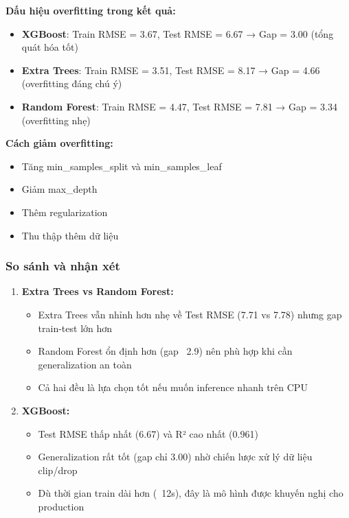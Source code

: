\documentclass[12pt,a4paper]{article}
\begin{document}
\textbf{Dấu hiệu overfitting trong kết quả:}
\begin{itemize}
    \item \textbf{XGBoost}: Train RMSE = 3.67, Test RMSE = 6.67 → Gap = 3.00 (tổng quát hóa tốt)
    \item \textbf{Extra Trees}: Train RMSE = 3.51, Test RMSE = 8.17 → Gap = 4.66 (overfitting đáng chú ý)
    \item \textbf{Random Forest}: Train RMSE = 4.47, Test RMSE = 7.81 → Gap = 3.34 (overfitting nhẹ)
\end{itemize}

\textbf{Cách giảm overfitting:}
\begin{itemize}
    \item Tăng min\_samples\_split và min\_samples\_leaf
    \item Giảm max\_depth
    \item Thêm regularization
    \item Thu thập thêm dữ liệu
\end{itemize}

\subsubsection{So sánh và nhận xét}

\begin{enumerate}
    \item \textbf{Extra Trees vs Random Forest:} 
    \begin{itemize}
        \item Extra Trees vẫn nhỉnh hơn nhẹ về Test RMSE (7.71 vs 7.78) nhưng gap train-test lớn hơn
        \item Random Forest ổn định hơn (gap ~2.9) nên phù hợp khi cần generalization an toàn
        \item Cả hai đều là lựa chọn tốt nếu muốn inference nhanh trên CPU
    \end{itemize}
    
    \item \textbf{XGBoost:}
    \begin{itemize}
        \item Test RMSE thấp nhất (6.67) và R² cao nhất (0.961)
        \item Generalization rất tốt (gap chỉ 3.00) nhờ chiến lược xử lý dữ liệu clip/drop
        \item Dù thời gian train dài hơn (~12s), đây là mô hình được khuyến nghị cho production
    \end{itemize}
\end{enumerate}
\end{document}
